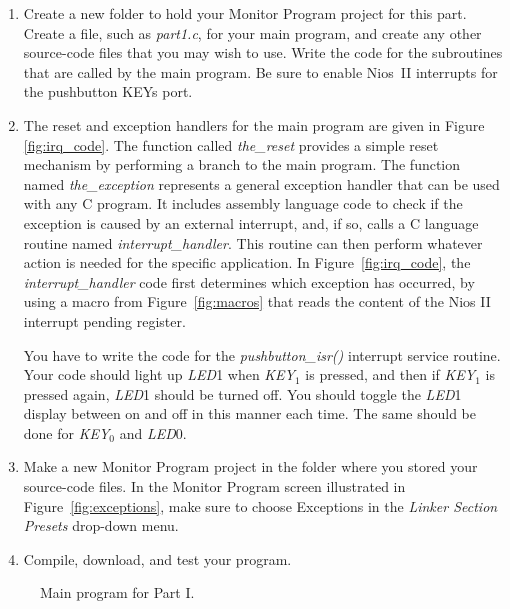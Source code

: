 \documentclass[epsfig,10pt,fullpage]{article}
\begin{document}
\begin{enumerate}
\item Create a new folder to hold your Monitor Program project for this part. Create a
file, such as {\it part1.c}, for your main program, and create any other source-code files 
that you may wish to use.  Write the code for the subroutines that are called by the 
main program. Be sure to enable Nios~II interrupts for the pushbutton KEYs port.

\item 
The reset and exception handlers for the main program are given in Figure \ref{fig:irq_code}. 
The function called {\it the\_reset} provides a simple reset mechanism by
performing a branch to the main program. The function named {\it the\_exception} 
represents a general exception handler that can be used with any C program. It includes 
assembly language code to check if the exception is caused by an external interrupt, and, 
if so, calls a C language routine named {\it interrupt\_handler}. This routine can then 
perform whatever action is needed for the specific application. In 
Figure~\ref{fig:irq_code}, the {\it interrupt\_handler} code first 
determines which exception has occurred, by using a macro from Figure~\ref{fig:macros} 
that reads the content of the Nios II interrupt pending register. 
  
\newpage
You have to write the code for the {\it pushbutton\_isr()} interrupt service routine.
Your code should light up {\it LED}1 when {\it KEY}$_1$ is pressed, and then if {\it KEY}$_1$
is pressed again, {\it LED}1 should be turned off. You should toggle the {\it LED}1 display between
on and off in this manner each time. The same should be done 
for {\it KEY}$_0$ and {\it LED}0.

\item
Make a new Monitor Program project in the folder where you stored your source-code files.
In the Monitor Program screen illustrated in Figure~\ref{fig:exceptions}, make sure 
to choose {\sf Exceptions} in the {\it Linker Section Presets} drop-down menu.

\item
Compile, download, and test your program. 
\end{enumerate}

\begin{figure}[H]
\begin{center}

\end{center}
\caption{Main program for Part I.}
\label{fig:code}
\end{figure}
\end{document}
